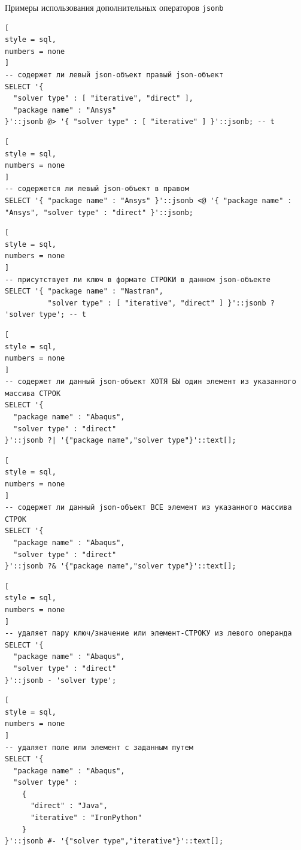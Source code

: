 \documentclass[%
	11pt,
	a4paper,
	utf8,
		]{article}
\begin{document}
Примеры использования дополнительных операторов \texttt{jsonb}
\begin{lstlisting}[
style = sql, 
numbers = none
]
-- содержет ли левый json-объект правый json-объект
SELECT '{
  "solver type" : [ "iterative", "direct" ],
  "package name" : "Ansys"
}'::jsonb @> '{ "solver type" : [ "iterative" ] }'::jsonb; -- t
\end{lstlisting}

\begin{lstlisting}[
style = sql, 
numbers = none
]
-- содержется ли левый json-объект в правом
SELECT '{ "package name" : "Ansys" }'::jsonb <@ '{ "package name" : "Ansys", "solver type" : "direct" }'::jsonb;
\end{lstlisting}

\begin{lstlisting}[
style = sql, 
numbers = none
]
-- присутствует ли ключ в формате СТРОКИ в данном json-объекте
SELECT '{ "package name" : "Nastran",
          "solver type" : [ "iterative", "direct" ] }'::jsonb ? 'solver type'; -- t
\end{lstlisting}

\begin{lstlisting}[
style = sql, 
numbers = none
]
-- содержет ли данный json-объект ХОТЯ БЫ один элемент из указанного массива СТРОК
SELECT '{
  "package name" : "Abaqus",
  "solver type" : "direct"
}'::jsonb ?| '{"package name","solver type"}'::text[];
\end{lstlisting}

\begin{lstlisting}[
style = sql, 
numbers = none
]
-- содержет ли данный json-объект ВСЕ элемент из указанного массива СТРОК
SELECT '{
  "package name" : "Abaqus",
  "solver type" : "direct"
}'::jsonb ?& '{"package name","solver type"}'::text[];
\end{lstlisting}

\begin{lstlisting}[
style = sql, 
numbers = none
]
-- удаляет пару ключ/значение или элемент-СТРОКУ из левого операнда 
SELECT '{
  "package name" : "Abaqus",
  "solver type" : "direct"
}'::jsonb - 'solver type';
\end{lstlisting}

\begin{lstlisting}[
style = sql, 
numbers = none
]
-- удаляет поле или элемент с заданным путем
SELECT '{
  "package name" : "Abaqus",
  "solver type" :
    {
      "direct" : "Java",
      "iterative" : "IronPython"
    }
}'::jsonb #- '{"solver type","iterative"}'::text[];
\end{lstlisting}
\end{document}
